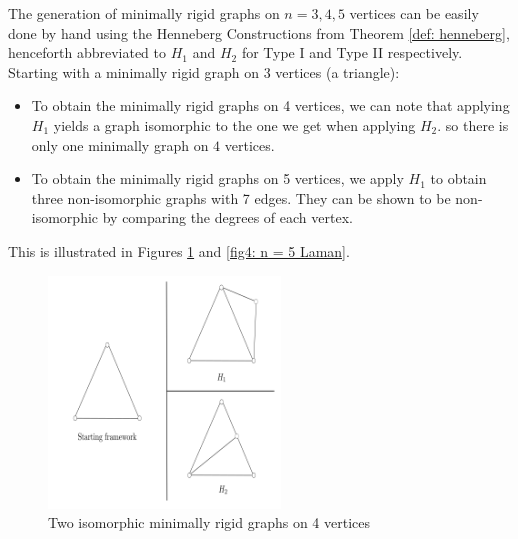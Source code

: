 \begin{flushleft}   
The generation of minimally rigid graphs on $n = 3,4,5$ vertices can be easily done by hand using the Henneberg Constructions from Theorem \ref{def: henneberg}, henceforth abbreviated to $H_1$ and $H_2$ for Type I and Type II respectively. Starting with a minimally rigid graph on 3 vertices (a triangle):
\begin{itemize}
    \item To obtain the minimally rigid graphs on 4 vertices, we can note that applying $H_1$ yields a graph isomorphic to the one we get when applying $H_2$. so there is only one minimally graph on $4$ vertices. 
    \item To obtain the minimally rigid graphs on 5 vertices, we apply $H_1$ to obtain three non-isomorphic graphs with 7 edges. They can be shown to be non-isomorphic by comparing the degrees of each vertex.
\end{itemize}

\noindent
This is illustrated in Figures \ref{fig4: n = 4 Laman} and \ref{fig4: n = 5 Laman}.
\end{flushleft}
\vspace{-4mm}
\begin{figure}[htbp]
    \centering
    \includegraphics[width = 0.55\textwidth]{Chapter 4/3. n=4.png}
    \caption{Two isomorphic minimally rigid graphs on 4 vertices}
    \label{fig4: n = 4 Laman}
\end{figure}

